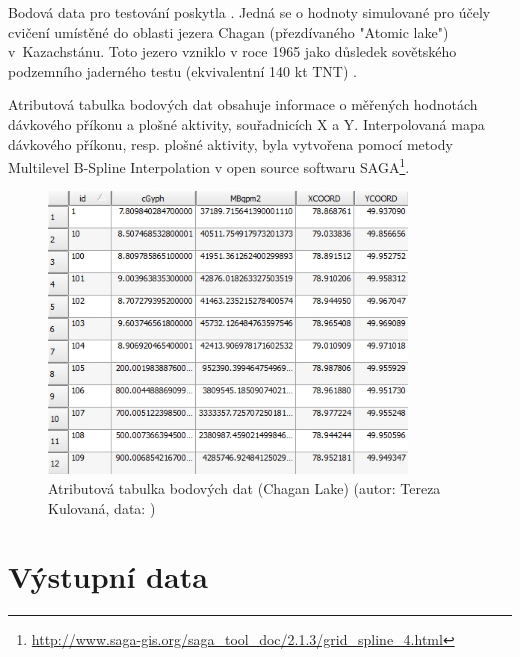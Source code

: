 Bodová data pro testování poskytla . Jedná se o hodnoty
simulované pro účely cvičení umístěné do oblasti jezera Chagan
(přezdívaného "Atomic lake") v~Kazachstánu. Toto jezero vzniklo v roce
1965 jako důsledek sovětského podzemního jader\-ného testu (ekvivalentní
140 kt TNT) \cite{Nordyke2000}.

Atributová tabulka bodových dat obsahuje informace o měřených
hodnotách dávkového příkonu a plošné aktivity, souřadnicích X a
Y. Interpolovaná mapa dávko\-vého příkonu, resp. plošné aktivity, byla
vytvořena pomocí metody Multilevel B-Spline Interpolation v open
source  softwaru
SAGA\footnote{\url{http://www.saga-gis.org/saga_tool_doc/2.1.3/grid_spline_4.html}}.
  
\begin{figure}[H] \centering
      \includegraphics[width=270pt]{./pictures/chagan_attr.jpg}
      \caption[Atributová tabulka bodových dat (Chagan
      Lake)]{Atributová tabulka bodových dat (Chagan Lake) (autor:
        Tereza Kulovaná, data: )}
      \label{fig:attributes}
\end{figure}

\section{Výstupní data}
\label{output}

